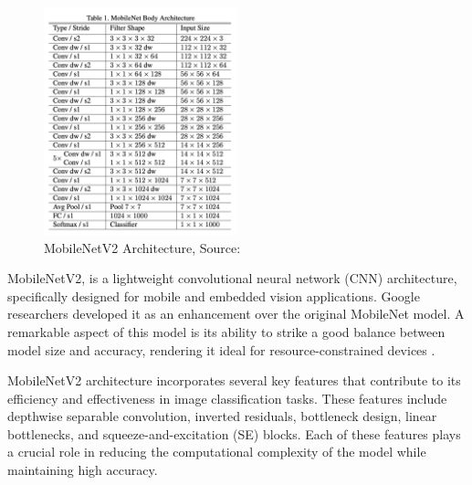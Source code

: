         \begin{figure}[h]
            \includegraphics[width=0.5\textwidth, center]{graphics/chapter3/mobnetV1.png}
            \caption{MobileNetV2 Architecture, Source: \cite{mobilenetV1}}
            \label{fig:MobileNetV2}
        \end{figure}
        
        MobileNetV2, is a lightweight convolutional neural network (CNN) architecture, specifically designed for mobile and embedded vision applications. Google researchers developed it as an enhancement over the original MobileNet model. A remarkable aspect of this model is its ability to strike a good balance between model size and accuracy, rendering it ideal for resource-constrained devices \cite{mobilenetV1}.\par \vspace{1em}

        MobileNetV2 architecture incorporates several key features that contribute to its efficiency and effectiveness in image classification tasks. These features include depthwise separable convolution, inverted residuals, bottleneck design, linear bottlenecks, and squeeze-and-excitation (SE) blocks\cite{mobilenetV2}. Each of these features plays a crucial role in reducing the computational complexity of the model while maintaining high accuracy.
        
